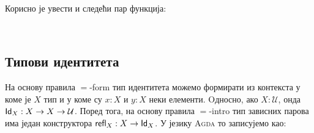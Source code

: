 \begin{code}
\AgdaOperator{\AgdaInductiveConstructor{,}}\AgdaSpace{}%
\AgdaBound{)}\AgdaSpace{}%
\AgdaSymbol{:}\AgdaSpace{}%
\AgdaSpace{}%
\AgdaSpace{}%
\AgdaSymbol{)}\AgdaSpace{}%
\AgdaSpace{}%
\AgdaSpace{}%
\AgdaSymbol{(}\AgdaSpace{}%
\AgdaOperator{\AgdaInductiveConstructor{,}}\AgdaSpace{}%
\AgdaSymbol{)}\<%
\\
\>[0]\AgdaSpace{}%
\AgdaSpace{}%
\AgdaSymbol{(}\AgdaSpace{}%
\AgdaOperator{\AgdaInductiveConstructor{,}}\AgdaSpace{}%
\AgdaSymbol{)}\AgdaSpace{}%
\AgdaSymbol{=}\AgdaSpace{}%
\AgdaSpace{}%
\AgdaSpace{}%
\<%
\end{code}

Корисно је увести и следећи пар функција:
\begin{code}%
\>[0]\AgdaSpace{}%
\AgdaSymbol{:}\AgdaSpace{}%
\AgdaSpace{}%
\AgdaSpace{}%
\AgdaSpace{}%
\AgdaSpace{}%
\AgdaSpace{}%
\AgdaSpace{}%
\AgdaSpace{}%
\AgdaSpace{}%
\AgdaSpace{}%
\<%
\\
\>[0]\AgdaSpace{}%
\AgdaSpace{}%
\AgdaSpace{}%
\AgdaSymbol{=}\AgdaSpace{}%
\AgdaSymbol{(}\AgdaSpace{}%
\AgdaSpace{}%
\AgdaSymbol{)}\AgdaSpace{}%
\AgdaSpace{}%
\AgdaSymbol{(}\AgdaSpace{}%
\AgdaSpace{}%
\AgdaSymbol{)}\<%
\end{code}

\subsection{Типови идентитета}

На основу правила $=$-form тип идентитета можемо формирати из контекста у коме је $X$ тип и у коме су $x : X$ и $y : X$ неки елементи. Oдносно, ако $X : \mathcal{U}$, онда $\mathsf{Id}_{X} : X \to X \to \mathcal{U}$. Поред тога, на основу правила $=$-intro тип зависних парова има један конструктора $\mathsf{refl}_{X} : X \to \mathsf{Id}_{X}$. У језику \textsc{Agda} то записујемо као:

